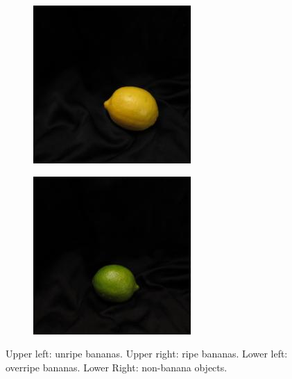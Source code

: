 \documentclass{article} %
\begin{document}
\begin{figure}[h]
\begin{subfigure}{.123\textwidth}
\end{subfigure}%
  \begin{subfigure}{.123\textwidth}
  \centering
\includegraphics[width=\textwidth]{3_17.jpg}
\end{subfigure}%
  \begin{subfigure}{.123\textwidth}
  \centering
\includegraphics[width=\textwidth]{3_13.jpg}
\end{subfigure}%
\caption{Upper left: unripe bananas. Upper right: ripe bananas. Lower left: overripe bananas. Lower Right: non-banana objects.}
\label{fig:sampleDataset}
\end{figure}
\end{document}

